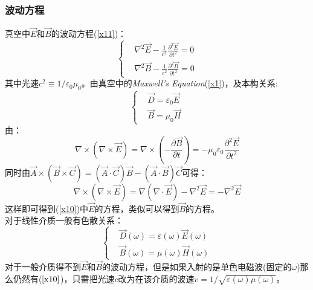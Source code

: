 \documentclass[12pt]{article}
\begin{document}
\subsubsection{波动方程}
真空中$\Vec{E}$和$\Vec{B}$的波动方程(\ref{x11})：
\begin{equation}
    \left\{
    \begin{split}
        &\nabla^2 \Vec{E}-\frac{1}{c^2}\frac{\partial^2\Vec{E}}{\partial t^2}=0\\
        &\nabla^2 \Vec{B}-\frac{1}{c^2}\frac{\partial^2\Vec{B}}{\partial t^2}=0
    \end{split}\right.
    \label{x10}
\end{equation}
其中光速$c^2\equiv 1/\varepsilon_0\mu_0$。由真空中的\textit{Maxwell}\textit{'s Equation}(\ref{x1})，及本构关系:
\begin{equation}\left\{
    \begin{split}
        &\Vec{D}=\varepsilon_0 \Vec{E}\\
        &\Vec{B}=\mu_0 \Vec{H}
    \end{split}\right.
\end{equation}
由：
\begin{equation}
    \nabla\times(\nabla\times\Vec{E})=\nabla\times(-\frac{\partial\Vec{B}}{\partial t})=-\mu_0\varepsilon_0\frac{\partial^2 \Vec{E}}{\partial t^2}
\end{equation}
同时由$\Vec{A}\times(\Vec{B}\times\Vec{C})=(\Vec{A}\cdot\Vec{C})\Vec{B}-(\Vec{A}\cdot\Vec{B})\Vec{C}$可得：
\begin{equation}
\nabla\times(\nabla\times\Vec{E})=\nabla(\nabla\cdot\Vec{E})-\nabla^2\Vec{E}=-\nabla^2\Vec{E}
\end{equation}
这样即可得到(\ref{x10})中$\vec{E}$的方程，类似可以得到$\Vec{B}$的方程。\\
对于线性介质一般有色散关系：
\begin{equation}
    \left\{
    \begin{split}
        &\Vec{D}(\omega)=\varepsilon(\omega)\Vec{E}(\omega)\\
        &\Vec{B}(\omega)=\mu(\omega)\Vec{H}(\omega)
    \end{split}\right.
\end{equation}
对于一般介质得不到$\vec{E}$和$\Vec{B}$的波动方程，但是如果入射的是单色电磁波(固定的$\omega$)那么仍然有($\ref{x10}$)，只需把光速$c$改为在该介质的波速$v=1/\sqrt{\varepsilon(\omega)\mu(\omega)}$。
\end{document}
